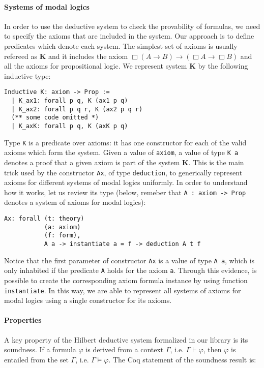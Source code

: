 \documentclass[sigconf,anonymous]{acmart}
\begin{document}
\paragraph{Systems of modal logics} In order to use the deductive system to
check the provability of formulas, we need to specify the axioms that are
included in the system. Our approach is to define predicates
which denote each system. The simplest set of axioms is usually refereed as
\textbf{K} and it includes the axiom $\Box(A \to B) \to (\Box A \to \Box B)$
and all the axioms for propositional logic. We represent system \textbf{K}
by the following inductive type:
\begin{verbatim}
Inductive K: axiom -> Prop :=
  | K_ax1: forall p q, K (ax1 p q)
  | K_ax2: forall p q r, K (ax2 p q r)
  (** some code omitted *)
  | K_axK: forall p q, K (axK p q)
\end{verbatim}
Type \texttt{K} is a predicate over axioms: it has one constructor for
each of the valid axioms which form the system. Given a value
of \texttt{axiom}, a value of type \texttt{K a} denotes a
proof that a given axiom is part of the system \textbf{K}. This is the main
trick used by the constructor \texttt{Ax}, of type
\texttt{deduction}, to generically represent axioms for
different systems of modal logics uniformly. In order to understand how it
works, let us review its type (below, remeber that \texttt{A : axiom -> Prop}
denotes a system of axioms for modal logics):
\begin{verbatim}
Ax: forall (t: theory)
           (a: axiom)
           (f: form),
           A a -> instantiate a = f -> deduction A t f
\end{verbatim}
Notice that the first parameter of constructor \texttt{Ax} is a value
of type \texttt{A a}, which is only inhabited if the predicate
\texttt{A} holds for the axiom \texttt{a}. Through this
evidence, is possible to create the corresponding axiom formula instance by
using function \texttt{instantiate}. In this way, we are able to
represent all systems of axioms for modal logics using a single constructor
for its axioms.

\paragraph{Properties} A key property of the Hilbert deductive system formalized
in our library is its soundness. If a formula $\varphi$ is derived from a
context $\Gamma$, i.e. $\Gamma\vdash\varphi$, then $\varphi$ is entailed from
the set $\Gamma$, i.e. $\Gamma\models\varphi$. The Coq statement of the soundness
result is:
\end{document}
